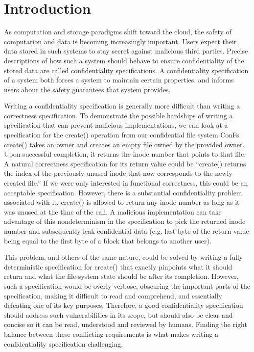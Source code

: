 
\section{Introduction}
As computation and storage paradigms shift toward the cloud, the safety of computation and data is becoming increasingly important. Users expect their data stored in such systems to stay secret against malicious third parties. Precise descriptions of how such a system should behave to ensure confidentiality of the stored data are called confidentiality specifications. A confidentiality specification of a system both forces a system to maintain certain properties, and informs users about the safety guarantees that system provides. 

Writing a confidentiality specification is generally more difficult than writing a correctness specification. To demonstrate the possible hardships of writing a specification that can prevent malicious implementations, we can look at a specification for the create() operation from our confidential file system ConFs. create() takes an owner and creates an empty file owned by the provided owner. Upon successful completion, it returns the inode number that points to that file. A natural correctness specification for its return value could be “create() returns the index of the previously unused inode that now corresponds to the newly created file.” If we were only interested in functional correctness, this could be an acceptable specification. However, there is a substantial confidentiality problem associated with it. create() is allowed to return any inode number as long as it was unused at the time of the call. A malicious implementation can take advantage of this nondeterminism in the specification to pick the returned inode number and subsequently leak confidential data (e.g. last byte of the return value being equal to the first byte of a block that belongs to another user).

This problem, and others of the same nature, could be solved by writing a fully deterministic specification for create() that exactly pinpoints what it should return and what the file-system state should be after its completion. However, such a specification would be overly verbose, obscuring the important parts of the specification, making it difficult to read and comprehend, and essentially defeating one of its key purposes. Therefore, a good confidentiality specification should address such vulnerabilities in its scope, but should also be clear and concise so it can be read, understood and reviewed by humans. Finding the right balance between these conflicting requirements is what makes writing a confidentiality specification challenging.

